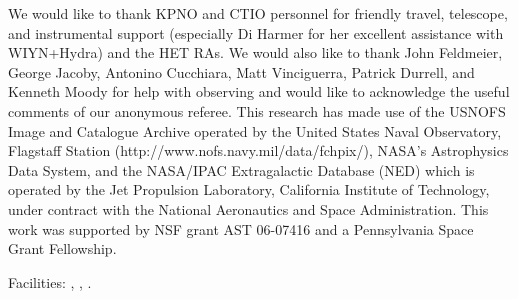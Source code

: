 \documentclass[12pt,preprint]{emulateapj}
\begin{document}
\acknowledgments
We would like to thank KPNO and CTIO personnel for friendly travel, telescope, and instrumental support (especially Di Harmer for her excellent assistance with WIYN+Hydra) and the HET RAs.  We would also like to thank John Feldmeier, George Jacoby, Antonino Cucchiara, Matt Vinciguerra, Patrick Durrell, and Kenneth Moody for help with observing and would like to acknowledge the useful comments of our anonymous referee.  This research has made use of the USNOFS Image and Catalogue Archive operated by the United States Naval Observatory, Flagstaff Station (http://www.nofs.navy.mil/data/fchpix/), NASA's Astrophysics Data System, and the NASA/IPAC Extragalactic Database (NED) which is operated by the Jet Propulsion Laboratory, California Institute of Technology, under contract with the National Aeronautics and Space Administration.  This work was supported by NSF grant AST 06-07416 and a Pennsylvania Space Grant Fellowship.

Facilities: , , .
\end{document}
